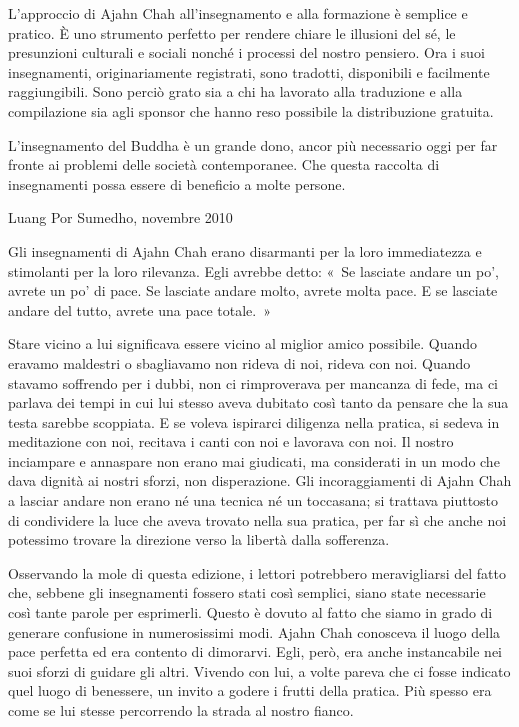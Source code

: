 L'approccio di Ajahn Chah all'insegnamento e alla formazione è semplice
e pratico. È uno strumento perfetto per rendere chiare le illusioni del
sé, le presunzioni culturali e sociali nonché i processi del nostro
pensiero. Ora i suoi insegnamenti, originariamente registrati, sono
tradotti, disponibili e facilmente raggiungibili. Sono perciò grato sia
a chi ha lavorato alla traduzione e alla compilazione sia agli sponsor
che hanno reso possibile la distribuzione gratuita.

L'insegnamento del Buddha è un grande dono, ancor più necessario oggi
per far fronte ai problemi delle società contemporanee. Che questa
raccolta di insegnamenti possa essere di beneficio a molte persone.

Luang Por Sumedho, novembre 2010

Gli insegnamenti di Ajahn Chah erano disarmanti per la loro immediatezza
e stimolanti per la loro rilevanza. Egli avrebbe detto: «~Se lasciate
andare un po', avrete un po' di pace. Se lasciate andare molto, avrete
molta pace. E se lasciate andare del tutto, avrete una pace totale.~»

Stare vicino a lui significava essere vicino al miglior amico possibile.
Quando eravamo maldestri o sbagliavamo non rideva di noi, rideva con
noi. Quando stavamo soffrendo per i dubbi, non ci rimproverava per
mancanza di fede, ma ci parlava dei tempi in cui lui stesso aveva
dubitato così tanto da pensare che la sua testa sarebbe scoppiata. E se
voleva ispirarci diligenza nella pratica, si sedeva in meditazione con
noi, recitava i canti con noi e lavorava con noi. Il nostro inciampare e
annaspare non erano mai giudicati, ma considerati in un modo che dava
dignità ai nostri sforzi, non disperazione. Gli incoraggiamenti di Ajahn
Chah a lasciar andare non erano né una tecnica né un toccasana; si
trattava piuttosto di condividere la luce che aveva trovato nella sua
pratica, per far sì che anche noi potessimo trovare la direzione verso
la libertà dalla sofferenza.

Osservando la mole di questa edizione, i lettori potrebbero
meravigliarsi del fatto che, sebbene gli insegnamenti fossero stati così
semplici, siano state necessarie così tante parole per esprimerli.
Questo è dovuto al fatto che siamo in grado di generare confusione in
numerosissimi modi. Ajahn Chah conosceva il luogo della pace perfetta ed
era contento di dimorarvi. Egli, però, era anche instancabile nei suoi
sforzi di guidare gli altri. Vivendo con lui, a volte pareva che ci
fosse indicato quel luogo di benessere, un invito a godere i frutti
della pratica. Più spesso era come se lui stesse percorrendo la strada
al nostro fianco.

